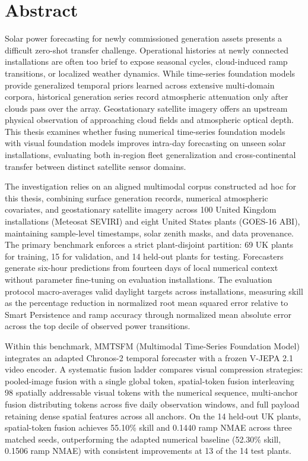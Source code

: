 \chapter*{Abstract} %
\label{abstract}
\label{abtract}


Solar power forecasting for newly commissioned generation assets presents a difficult zero-shot transfer challenge. Operational histories at newly connected installations are often too brief to expose seasonal cycles, cloud-induced ramp transitions, or localized weather dynamics. While time-series foundation models provide generalized temporal priors learned across extensive multi-domain corpora, historical generation series record atmospheric attenuation only after clouds pass over the array. Geostationary satellite imagery offers an upstream physical observation of approaching cloud fields and atmospheric optical depth. This thesis examines whether fusing numerical time-series foundation models with visual foundation models improves intra-day forecasting on unseen solar installations, evaluating both in-region fleet generalization and cross-continental transfer between distinct satellite sensor domains.

The investigation relies on an aligned multimodal corpus constructed ad hoc for this thesis, combining surface generation records, numerical atmospheric covariates, and geostationary satellite imagery across 100 United Kingdom installations (Meteosat SEVIRI) and eight United States plants (GOES-16 ABI), maintaining sample-level timestamps, solar zenith masks, and data provenance. The primary benchmark enforces a strict plant-disjoint partition: 69 UK plants for training, 15 for validation, and 14 held-out plants for testing. Forecasters generate six-hour predictions from fourteen days of local numerical context without parameter fine-tuning on evaluation installations. The evaluation protocol macro-averages valid daylight targets across installations, measuring skill as the percentage reduction in normalized root mean squared error relative to Smart Persistence and ramp accuracy through normalized mean absolute error across the top decile of observed power transitions.

Within this benchmark, MMTSFM (Multimodal Time-Series Foundation Model) integrates an adapted Chronos-2 temporal forecaster with a frozen V-JEPA 2.1 video encoder. A systematic fusion ladder compares visual compression strategies: pooled-image fusion with a single global token, spatial-token fusion interleaving 98 spatially addressable visual tokens with the numerical sequence, multi-anchor fusion distributing tokens across five daily observation windows, and full payload retaining dense spatial features across all anchors. On the 14 held-out UK plants, spatial-token fusion achieves 55.10\% skill and 0.1440 ramp NMAE across three matched seeds, outperforming the adapted numerical baseline (52.30\% skill, 0.1506 ramp NMAE) with consistent improvements at 13 of the 14 test plants.

